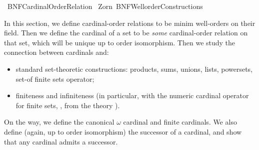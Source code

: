 %
\begin{isabellebody}%
%
%
\isadelimdocument
%
\endisadelimdocument
%
\isatagdocument
%
\isamarkuptrue%
%
\endisatagdocument
{\isafolddocument}%
%
\isadelimdocument
%
\endisadelimdocument
%
\isadelimtheory
%
\endisadelimtheory
%
\isatagtheory
{}\isamarkupfalse%
\ BNF{\isacharunderscore}{\kern0pt}Cardinal{\isacharunderscore}{\kern0pt}Order{\isacharunderscore}{\kern0pt}Relation\isanewline
{}\ Zorn\ BNF{\isacharunderscore}{\kern0pt}Wellorder{\isacharunderscore}{\kern0pt}Constructions\isanewline
{}%
\endisatagtheory
{\isafoldtheory}%
%
\isadelimtheory
%
\endisadelimtheory
%
\begin{isamarkuptext}%
In this section, we define cardinal-order relations to be minim well-orders
on their field.  Then we define the cardinal of a set to be {\em some} cardinal-order
relation on that set, which will be unique up to order isomorphism.  Then we study
the connection between cardinals and:
\begin{itemize}
\item standard set-theoretic constructions: products,
sums, unions, lists, powersets, set-of finite sets operator;
\item finiteness and infiniteness (in particular, with the numeric cardinal operator
for finite sets, , from the theory ).
\end{itemize}
%
On the way, we define the canonical $\omega$ cardinal and finite cardinals.  We also
define (again, up to order isomorphism) the successor of a cardinal, and show that
any cardinal admits a successor.


\end{isamarkuptext}
\end{isabellebody}
